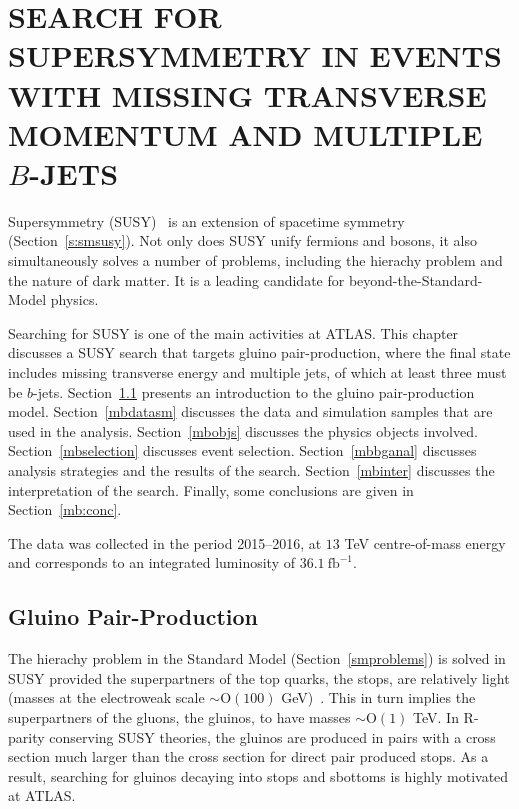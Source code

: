 \chapter{SEARCH FOR SUPERSYMMETRY IN EVENTS WITH MISSING TRANSVERSE MOMENTUM AND
  MULTIPLE $B$-JETS}\label{c:susys}

Supersymmetry
(SUSY)~\cite{Golfand:1971iw,Volkov:1973ix,Wess:1974tw,Wess:1974jb,Ferrara:1974pu,Salam:1974ig}
is an extension of spacetime symmetry (Section~\ref{s:smsusy}). Not only does
SUSY unify fermions and bosons, it also simultaneously solves a number of
problems, including the hierachy problem and the nature of dark matter. It is a
leading candidate for beyond-the-Standard-Model physics.

Searching for SUSY is one of the main activities at ATLAS. This chapter
discusses a SUSY search that targets gluino pair-production, where the final
state includes missing transverse energy and multiple jets, of which at least
three must be $b$-jets. Section~\ref{mbmodel} presents an introduction to the
gluino pair-production model. Section~\ref{mbdatasm} discusses the data and
simulation samples that are used in the analysis. Section~\ref{mbobjs}
discusses the physics objects involved. Section~\ref{mbselection} discusses
event selection. Section~\ref{mbbganal} discusses analysis strategies and the
results of the search. Section~\ref{mbinter} discusses the interpretation of
the search. Finally, some conclusions are given in Section~\ref{mb:conc}. 


The data was collected in the period 2015--2016, at $13$ TeV centre-of-mass
energy and corresponds to an integrated luminosity of $36.1~\text{fb}^{-1}$.


\section{Gluino Pair-Production}\label{mbmodel}

The hierachy problem in the Standard Model (Section~\ref{smproblems}) is solved
in SUSY provided the superpartners of the top quarks, the stops, are relatively
light (masses at the electroweak scale $\sim \text{O}(100)$
GeV)~\cite{susynatural}. This in turn implies the superpartners of the gluons,
the gluinos, to have masses $\sim \text{O}(1)$ TeV. In R-parity conserving SUSY
theories, the gluinos are produced in pairs with a cross section much larger
than the cross section for direct pair produced stops. As a result, searching
for gluinos decaying into stops and sbottoms is highly motivated at ATLAS.

